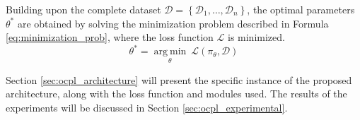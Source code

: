 Building upon the complete dataset $\mathcal{D} = \left\{\mathcal{D}_{1}, \dots, \mathcal{D}_{n}\right\}$, the optimal parameters $\theta^{*}$ are obtained by solving the minimization problem described in Formula \ref{eq:minimization_prob}, where the loss function $\mathcal{L}$ is minimized.
\begin{equation}
    \label{eq:minimization_prob}
    \theta^{*} = \underset{\theta}{\text{arg} \ \min} \ \mathcal{L}(\pi_{\theta}, \mathcal{D})
\end{equation}

Section \ref{sec:ocpl_architecture} will present the specific instance of the proposed architecture, along with the loss function and modules used. The results of the experiments will be discussed in Section \ref{sec:ocpl_experimental}.
